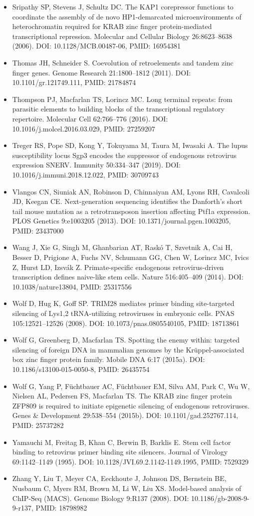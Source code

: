 \documentclass[11pt,a4paper]{article}
\begin{document}
\begin{itemize}
\item Sripathy SP, Stevens J, Schultz DC. The KAP1 corepressor functions to coordinate the assembly of de novo HP1-demarcated microenvironments of heterochromatin required for KRAB zinc finger protein-mediated transcriptional repression. Molecular and Cellular Biology 26:8623–8638 (2006). DOI: 10.1128/MCB.00487-06, PMID: 16954381
\item Thomas JH, Schneider S. Coevolution of retroelements and tandem zinc finger genes. Genome Research 21:1800–1812 (2011). DOI: 10.1101/gr.121749.111, PMID: 21784874
\item Thompson PJ, Macfarlan TS, Lorincz MC. Long terminal repeats: from parasitic elements to building blocks of the transcriptional regulatory repertoire. Molecular Cell 62:766–776 (2016). DOI: 10.1016/j.molcel.2016.03.029, PMID: 27259207
\item Treger RS, Pope SD, Kong Y, Tokuyama M, Taura M, Iwasaki A. The lupus susceptibility locus Sgp3 encodes the suppressor of endogenous retrovirus expression SNERV. Immunity 50:334–347 (2019). DOI: 10.1016/j.immuni.2018.12.022, PMID: 30709743
\item Vlangos CN, Siuniak AN, Robinson D, Chinnaiyan AM, Lyons RH, Cavalcoli JD, Keegan CE. Next-generation sequencing identifies the Danforth's short tail mouse mutation as a retrotransposon insertion affecting Ptf1a expression. PLOS Genetics 9:e1003205 (2013). DOI: 10.1371/journal.pgen.1003205, PMID: 23437000
\item Wang J, Xie G, Singh M, Ghanbarian AT, Raskó T, Szvetnik A, Cai H, Besser D, Prigione A, Fuchs NV, Schumann GG, Chen W, Lorincz MC, Ivics Z, Hurst LD, Izsvák Z. Primate-specific endogenous retrovirus-driven transcription defines naive-like stem cells. Nature 516:405–409 (2014). DOI: 10.1038/nature13804, PMID: 25317556
\item Wolf D, Hug K, Goff SP. TRIM28 mediates primer binding site-targeted silencing of Lys1,2 tRNA-utilizing retroviruses in embryonic cells. PNAS 105:12521–12526 (2008). DOI: 10.1073/pnas.0805540105, PMID: 18713861
\item Wolf G, Greenberg D, Macfarlan TS. Spotting the enemy within: targeted silencing of foreign DNA in mammalian genomes by the Krüppel-associated box zinc finger protein family. Mobile DNA 6:17 (2015a). DOI: 10.1186/s13100-015-0050-8, PMID: 26435754
\item Wolf G, Yang P, Füchtbauer AC, Füchtbauer EM, Silva AM, Park C, Wu W, Nielsen AL, Pedersen FS, Macfarlan TS. The KRAB zinc finger protein ZFP809 is required to initiate epigenetic silencing of endogenous retroviruses. Genes \& Development 29:538–554 (2015b). DOI: 10.1101/gad.252767.114, PMID: 25737282
\item Yamauchi M, Freitag B, Khan C, Berwin B, Barklis E. Stem cell factor binding to retrovirus primer binding site silencers. Journal of Virology 69:1142–1149 (1995). DOI: 10.1128/JVI.69.2.1142-1149.1995, PMID: 7529329
\item Zhang Y, Liu T, Meyer CA, Eeckhoute J, Johnson DS, Bernstein BE, Nusbaum C, Myers RM, Brown M, Li W, Liu XS. Model-based analysis of ChIP-Seq (MACS). Genome Biology 9:R137 (2008). DOI: 10.1186/gb-2008-9-9-r137, PMID: 18798982
\end{itemize}
\end{document}
